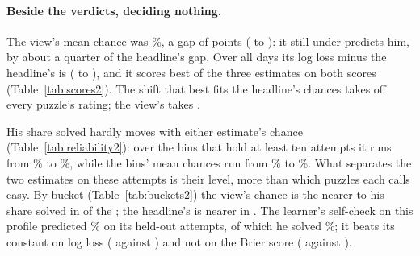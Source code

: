 \documentclass[11pt]{article}
\begin{document}
\paragraph{Beside the verdicts, deciding nothing.} The view's mean chance was \TwoView\%, a gap of
\TwoViewGap{} points (\TwoViewGapLo{} to \TwoViewGapHi): it still under-predicts him, by about a
quarter of the headline's gap. Over all \TwoDays{} days its log loss minus the headline's is
\TwoDiff{} (\TwoDiffLo{} to \TwoDiffHi), and it scores best of the three estimates on both scores
(Table~\ref{tab:scores2}). The shift that best fits the headline's chances takes \TwoShiftHead{}
off every puzzle's rating; the view's takes \TwoShiftView.

His share solved hardly moves with either estimate's chance (Table~\ref{tab:reliability2}): over
the bins that hold at least ten attempts it runs from \TwoBinLo\% to \TwoBinHi\%, while the bins'
mean chances run from \TwoBinChanceLo\% to \TwoBinChanceHi\%. What separates the two estimates on
these attempts is their level, more than which puzzles each calls easy. By bucket
(Table~\ref{tab:buckets2}) the view's chance is the nearer to his share solved in \TwoViewNearer{}
of the \TwoBuckets; the headline's is nearer in \TwoHeadNearerList. The learner's self-check on
this profile predicted \TwoSelfPred\% on its \TwoSelfN{} held-out attempts, of which he solved
\TwoSelfObs\%; it beats its constant on log loss (\TwoSelfLL{} against \TwoSelfBaseLL) and not on
the Brier score (\TwoSelfBrier{} against \TwoSelfBaseBrier).

\begin{table}[!htbp]
\centering\small
\TwoScoreTable
\caption{Round 2: each estimate's mean solve chance and scores on the \TwoAttempts{} scored
attempts. Lower is better for both scores.}
\label{tab:scores2}
\end{table}

\begin{table}[!htbp]
\centering\small
\TwoReliabilityTable
\caption{Round 2: the scored attempts binned by each estimate's solve chance.}
\label{tab:reliability2}
\end{table}

\begin{table}[!htbp]
\centering\small
\TwoBucketTable
\caption{Round 2: each bucket's scored attempts, the mean Lichess rating of its puzzles, the share
solved and each estimate's mean chance.}
\label{tab:buckets2}
\end{table}
\end{document}
